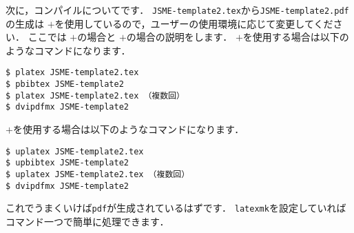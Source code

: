 次に，コンパイルについてです．
\verb|JSME-template2.tex|から\verb|JSME-template2.pdf|の生成は \upLaTeX$+$\upBibTeX を使用しているので，ユーザーの使用環境に応じて変更してください．
ここでは \pLaTeX$+$\pBibTeX の場合と \upLaTeX$+$\upBibTeX の場合の説明をします．
\pLaTeX$+$\pBibTeX を使用する場合は以下のようなコマンドになります．
\begin{tcolorbox}[enhanced, title=\pLaTeX$+$\pBibTeX, drop fuzzy shadow]
\begin{verbatim}
$ platex JSME-template2.tex
$ pbibtex JSME-template2
$ platex JSME-template2.tex （複数回）
$ dvipdfmx JSME-template2
\end{verbatim}
\end{tcolorbox}
\noindent
\upLaTeX$+$\upBibTeX を使用する場合は以下のようなコマンドになります．
\begin{tcolorbox}[enhanced, title=\upLaTeX$+$\upBibTeX, drop fuzzy shadow]
\begin{verbatim}
$ uplatex JSME-template2.tex
$ upbibtex JSME-template2
$ uplatex JSME-template2.tex （複数回）
$ dvipdfmx JSME-template2
\end{verbatim}
\end{tcolorbox}
\noindent
これでうまくいけば\verb|pdf|が生成されているはずです．
\verb|latexmk|を設定していればコマンド一つで簡単に処理できます．